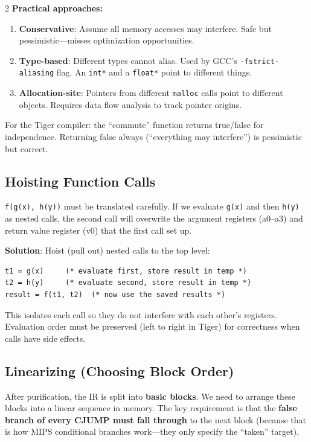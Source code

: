 \documentclass[9pt,landscape]{extarticle}
\begin{document}
\begin{multicols}{2}
\textbf{Practical approaches:}
\begin{enumerate}
  \item \textbf{Conservative}: Assume all memory accesses may interfere. Safe but pessimistic---misses optimization opportunities.
  \item \textbf{Type-based}: Different types cannot alias. Used by GCC's \texttt{-fstrict-aliasing} flag. An \texttt{int*} and a \texttt{float*} point to different things.
  \item \textbf{Allocation-site}: Pointers from different \texttt{malloc} calls point to different objects. Requires data flow analysis to track pointer origins.
\end{enumerate}

For the Tiger compiler: the ``commute'' function returns true/false for independence. Returning false always (``everything may interfere'') is pessimistic but correct.

\subsection{Hoisting Function Calls}

\texttt{f(g(x), h(y))} must be translated carefully. If we evaluate \texttt{g(x)} and then \texttt{h(y)} as nested calls, the second call will overwrite the argument registers (a0--a3) and return value register (v0) that the first call set up.

\textbf{Solution}: Hoist (pull out) nested calls to the top level:
\begin{lstlisting}
t1 = g(x)     (* evaluate first, store result in temp *)
t2 = h(y)     (* evaluate second, store result in temp *)
result = f(t1, t2)  (* now use the saved results *)
\end{lstlisting}

This isolates each call so they do not interfere with each other's registers. Evaluation order must be preserved (left to right in Tiger) for correctness when calls have side effects.

\subsection{Linearizing (Choosing Block Order)}

After purification, the IR is split into \textbf{basic blocks}. We need to arrange these blocks into a linear sequence in memory. The key requirement is that the \textbf{false branch of every CJUMP must fall through} to the next block (because that is how MIPS conditional branches work---they only specify the ``taken'' target).


\end{multicols}
\end{document}

